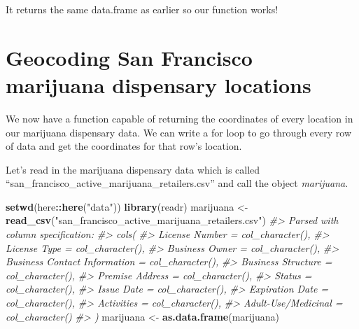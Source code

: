 \documentclass[
  12pt,
]{book}
\newenvironment{Shaded}{\begin{snugshade}}{\end{snugshade}}
\newcommand{\CommentTok}[1]{\textcolor[rgb]{0.56,0.35,0.01}{\textit{#1}}}
\newcommand{\KeywordTok}[1]{\textcolor[rgb]{0.13,0.29,0.53}{\textbf{#1}}}
\newcommand{\NormalTok}[1]{#1}
\newcommand{\OperatorTok}[1]{\textcolor[rgb]{0.81,0.36,0.00}{\textbf{#1}}}
\newcommand{\StringTok}[1]{\textcolor[rgb]{0.31,0.60,0.02}{#1}}
\begin{document}
It returns the same data.frame as earlier so our function works!

\hypertarget{geocoding-san-francisco-marijuana-dispensary-locations}{%
\section{Geocoding San Francisco marijuana dispensary locations}\label{geocoding-san-francisco-marijuana-dispensary-locations}}

We now have a function capable of returning the coordinates of every location in our marijuana dispensary data. We can write a for loop to go through every row of data and get the coordinates for that row's location.

Let's read in the marijuana dispensary data which is called ``san\_francisco\_active\_marijuana\_retailers.csv'' and call the object \emph{marijuana}.

\begin{Shaded}
\begin{Highlighting}[]
\KeywordTok{setwd}\NormalTok{(here}\OperatorTok{::}\KeywordTok{here}\NormalTok{(}\StringTok{"data"}\NormalTok{))}
\KeywordTok{library}\NormalTok{(readr)}
\NormalTok{marijuana <{-}}\StringTok{ }\KeywordTok{read\_csv}\NormalTok{(}\StringTok{"san\_francisco\_active\_marijuana\_retailers.csv"}\NormalTok{)}
\CommentTok{\#> Parsed with column specification:}
\CommentTok{\#> cols(}
\CommentTok{\#>   \textasciigrave{}License Number\textasciigrave{} = col\_character(),}
\CommentTok{\#>   \textasciigrave{}License Type\textasciigrave{} = col\_character(),}
\CommentTok{\#>   \textasciigrave{}Business Owner\textasciigrave{} = col\_character(),}
\CommentTok{\#>   \textasciigrave{}Business Contact Information\textasciigrave{} = col\_character(),}
\CommentTok{\#>   \textasciigrave{}Business Structure\textasciigrave{} = col\_character(),}
\CommentTok{\#>   \textasciigrave{}Premise Address\textasciigrave{} = col\_character(),}
\CommentTok{\#>   Status = col\_character(),}
\CommentTok{\#>   \textasciigrave{}Issue Date\textasciigrave{} = col\_character(),}
\CommentTok{\#>   \textasciigrave{}Expiration Date\textasciigrave{} = col\_character(),}
\CommentTok{\#>   Activities = col\_character(),}
\CommentTok{\#>   \textasciigrave{}Adult{-}Use/Medicinal\textasciigrave{} = col\_character()}
\CommentTok{\#> )}
\NormalTok{marijuana <{-}}\StringTok{ }\KeywordTok{as.data.frame}\NormalTok{(marijuana)}
\end{Highlighting}
\end{Shaded}
\end{document}
